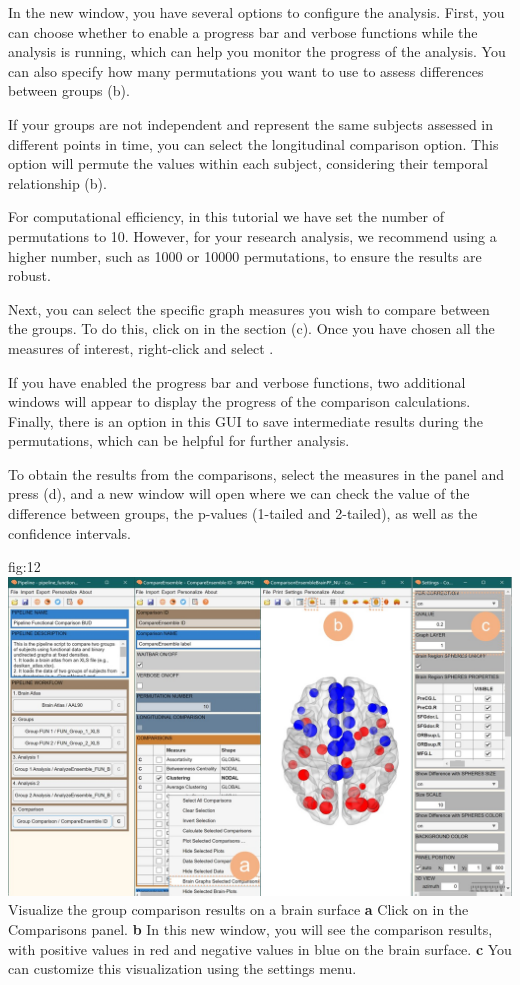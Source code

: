 \documentclass[justified]{tufte-handout}
\begin{document}

In the new window, you have several options to configure the analysis. First, you can choose whether to enable a progress bar and verbose functions while the analysis is running, which can help you monitor the progress of the analysis. You can also specify how many permutations you want to use to assess differences between groups (b).

If your groups are not independent and represent the same subjects assessed in different points in time, you can select the longitudinal comparison option. This option will permute the values within each subject, considering their temporal relationship (b).

For computational efficiency, in this tutorial we have set the number of permutations to 10. However, for your research analysis, we recommend using a higher number, such as 1000 or 10000 permutations, to ensure the results are robust.

Next, you can select the specific graph measures you wish to compare between the groups. To do this, click on  in the  section (c). Once you have chosen all the measures of interest, right-click and select .

If you have enabled the progress bar and verbose functions, two additional windows will appear to display the progress of the comparison calculations. Finally, there is an option in this GUI to save intermediate results during the permutations, which can be helpful for further analysis.
 
To obtain the results from the comparisons, select the measures in the  panel and press ({d}), and a new window will open where we can check the value of the difference between groups, the p-values (1-tailed and 2-tailed), as well as the confidence intervals.

	{fig:12}
	{
	\includegraphics{fig12.jpg}
	}
	{Visualize the group comparison results on a brain surface}
	{
	{\bf a} Click on  in the Comparisons panel.
	{\bf b} In this new window, you will see the comparison results, with positive values in red and negative values in blue on the brain surface.
{\bf c} You can customize this visualization using the settings menu.
	}
\end{document}
